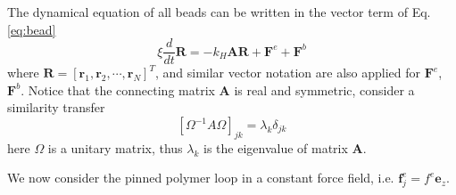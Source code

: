 \documentclass[12pt,a4paper]{article}
\begin{document}

The dynamical equation of all beads can be written in the vector term of Eq.
\eqref{eq:bead}
\begin{equation}
    \label{eq:beadVector}
    \xi \frac{d }{dt} \mathbf{R} = - k_H \mathbf{A} \mathbf{R} + \mathbf{F}^e + \mathbf{F}^b
\end{equation}
where $\mathbf{R} = \left[\mathbf r_1, \mathbf r_2, \cdots, \mathbf r_N\right]^T$,
and similar vector notation are also applied for $\mathbf{F}^e$, $\mathbf{F}^b$.
Notice that the connecting matrix $\mathbf{A}$ is real and symmetric, consider
a similarity transfer 
\begin{equation}
    \label{eq:similarityTransfer}
    \left[\Omega^{-1} A \Omega\right]_{jk} = \lambda_k\delta_{jk}
\end{equation}
here $\Omega$ is a unitary matrix, thus $\lambda_k$ is the eigenvalue of
matrix $\mathbf A$. 

We now consider the pinned polymer loop in a constant force field, i.e.
$\mathbf{f}_j^e = f^e \mathbf{e}_z$.







 
\end{document}
